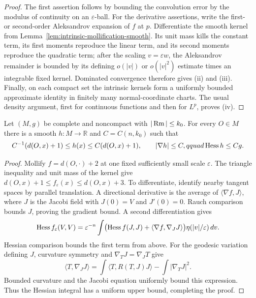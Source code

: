\begin{proof}
The first assertion follows by bounding the convolution error by the modulus
of continuity on an $\varepsilon$-ball.  For the derivative assertions, write
the first- or second-order Aleksandrov expansion of $f$ at $p$.  Differentiate
the smooth kernel from Lemma~\ref{lem:intrinsic-mollification-smooth}.  Its
unit mass kills the constant term, its first moments reproduce the linear
term, and its second moments reproduce the quadratic term; after the scaling
$v=\varepsilon w$, the Aleksandrov remainder is bounded by its defining
$o(|v|)$ or $o(|v|^2)$ estimate times an integrable fixed kernel.  Dominated
convergence therefore gives (ii) and (iii).  Finally, on each compact set the
intrinsic kernels form a uniformly bounded approximate identity in finitely
many normal-coordinate charts.  The usual density argument, first for
continuous functions and then for $L^p$, proves (iv).
\end{proof}

\begin{lemma}
\label{lem:bounded-curvature-distance-like-function}
Let $(M,g)$ be complete and noncompact with $|\operatorname{Rm}|\leq k_0$.  For every
$O\in M$ there is a smooth $h:M\to\mathbb R$ and $C=C(n,k_0)$ such that
\[
C^{-1}(d(O,x)+1)\leq h(x)\leq C(d(O,x)+1),
\qquad |\nabla h|\leq C,qquad \operatorname{Hess} h\leq Cg.
\]
\end{lemma}

\begin{proof}
Mollify $f=d(O,\cdot)+2$ at one fixed sufficiently small scale
$\varepsilon$.  The triangle inequality and unit mass of the kernel give
$d(O,x)+1\leq f_\varepsilon(x)\leq d(O,x)+3$.  To differentiate, identify
nearby tangent spaces by parallel translation.  A directional derivative is
the average of $\langle\nabla f,J\rangle$, where $J$ is the Jacobi field with
$J(0)=V$ and $J'(0)=0$.  Rauch comparison bounds $J$, proving the gradient
bound.  A second differentiation gives
\[
\operatorname{Hess} f_\varepsilon(V,V)=\varepsilon^{-n}\int
\bigl(\operatorname{Hess} f(J,J)+\langle\nabla f,\nabla_JJ\rangle\bigr)
\eta(|v|/\varepsilon)\,dv.
\]
Hessian comparison bounds the first term from above.  For the geodesic
variation defining $J$, curvature symmetry and $\nabla_TJ=\nabla_JT$ give
\[
\langle T,\nabla_JJ\rangle
=\int\langle T,R(T,J)J\rangle-\int|\nabla_TJ|^2.
\]
Bounded curvature and the Jacobi equation uniformly bound this expression.
Thus the Hessian integral has a uniform upper bound, completing the proof.
\end{proof}
